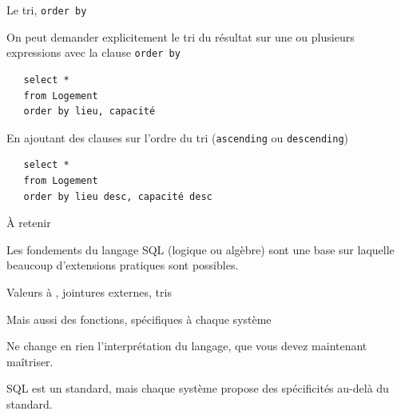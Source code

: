 \begin{frame}[fragile]{Le tri, \texttt{order by}}

On peut demander explicitement le tri du résultat sur
une ou plusieurs expressions avec la clause \texttt{order by}

\vfill


\begin{verbatim}
   select *  
   from Logement 
   order by lieu, capacité
\end{verbatim}

\vfill

En ajoutant des clauses sur l'ordre du tri (\texttt{ascending} ou \texttt{descending})

\vfill

\begin{verbatim}
   select *  
   from Logement 
   order by lieu desc, capacité desc
\end{verbatim}

\end{frame}
\begin{frame}{À retenir}

Les fondements du langage SQL (logique ou algèbre) sont une base sur laquelle
beaucoup d'extensions pratiques sont possibles.

\vfill

\begin{redbullet}
   \item Valeurs à , jointures externes, tris
  \item  Mais aussi des fonctions, spécifiques à chaque système
  \item Ne change en rien \alert{l'interprétation} du langage, que vous devez maintenant maîtriser.
\end{redbullet}

\vfill
SQL est un standard, mais chaque système propose des spécificités au-delà du standard.

\end{frame}

